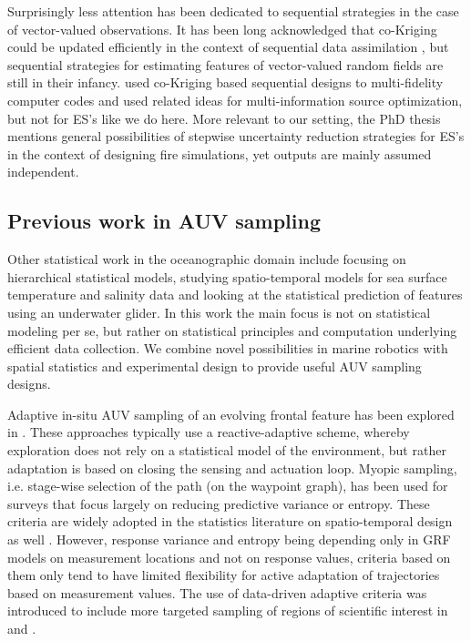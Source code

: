 \documentclass[aoas]{imsart}
\begin{document}
Surprisingly less attention has been dedicated to sequential
strategies in the case of vector-valued observations. It has been long
acknowledged that co-Kriging could be updated efficiently in the context of sequential data assimilation \citep{Vargas-Guzman1999}, but sequential
strategies for estimating features of vector-valued random fields are
still in their infancy. \cite{LeGratiet.etal2015} used co-Kriging
based sequential designs to multi-fidelity computer codes and
\cite{Poloczek2017} used related ideas for multi-information source
optimization, but not for ES's like we do here. More relevant to our
setting, the PhD thesis \citep[][p.82]{stroh} mentions general
possibilities of stepwise uncertainty reduction strategies for ES's in
the context of designing fire simulations, yet outputs are mainly
assumed independent.


\subsection{Previous work in AUV sampling}

Other statistical work in the oceanographic domain include
\cite{wikle2013modern} focusing on hierarchical statistical models,
\cite{sahu2008space} studying spatio-temporal models for sea surface
temperature and salinity data and \cite{mellucci2018oceanic} looking
at the statistical prediction of features using an underwater glider.
In this work the main focus is not on statistical modeling per se, but
rather on statistical principles and computation underlying efficient
data collection. We combine novel possibilities in marine robotics
with spatial statistics and experimental design to provide useful AUV
sampling designs.

Adaptive in-situ AUV sampling of an evolving frontal feature has been
explored in \cite{fronts11,Smith2016,Pinto2018,costa19}. These
approaches typically use a reactive-adaptive scheme, whereby
exploration does not rely on a statistical model of the environment,
but rather adaptation is based on closing the sensing and actuation
loop. Myopic sampling, i.e. stage-wise selection of the path (on the
waypoint graph), has been used for surveys
\citep{singh2009efficient,Binney2013} that focus largely on reducing
predictive variance or entropy. These criteria are widely adopted in
the statistics literature on spatio-temporal design as well
\citep{bueso1998state,zidek2019monitoring}. However, response variance and entropy being depending only in GRF models on measurement locations and not on response values, criteria based on them only tend to have limited flexibility for
active adaptation of trajectories based on measurement values.  The use
of data-driven adaptive criteria was introduced to include more
targeted sampling of regions of scientific interest in \cite{Low2009}
and \cite{fossuminformation}.
\end{document}
